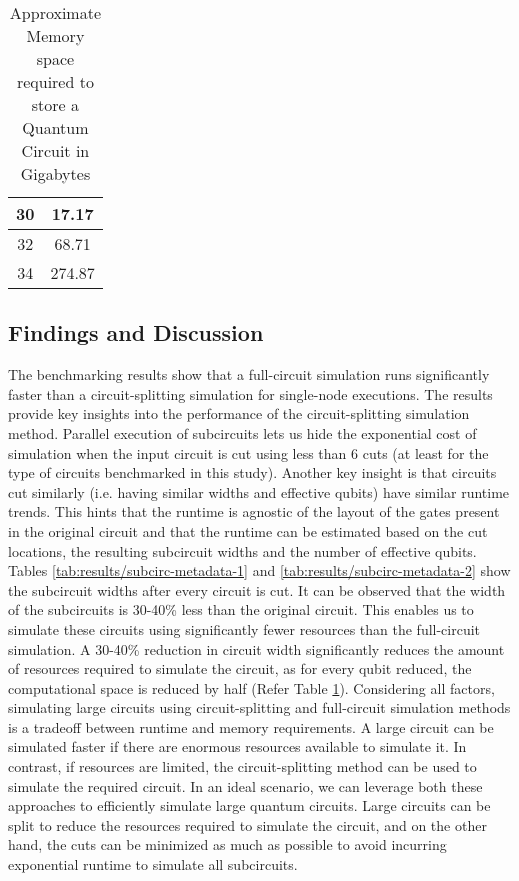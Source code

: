 \begin{table}[!htbp]
{\begin{tabular}{|c|c|}
30                     & 17.17                                                                                                       \\ \hline
32                     & 68.71                                                                                                       \\ \hline
34                     & 274.87                                                                                                      \\ \hline
\end{tabular}
}
\caption{Approximate Memory space required to store a Quantum Circuit in Gigabytes}
\label{tab:results/req_storage}
\end{table}



\subsection*{Findings and Discussion}

The benchmarking results show that a full-circuit simulation runs significantly faster than a circuit-splitting simulation for single-node executions. The results provide key insights into the performance of the circuit-splitting simulation method. Parallel execution of subcircuits lets us hide the exponential cost of simulation when the input circuit is cut using less than 6 cuts (at least for the type of circuits benchmarked in this study). Another key insight is that circuits cut similarly (i.e. having similar widths and effective qubits) have similar runtime trends. This hints that the runtime is agnostic of the layout of the gates present in the original circuit and that the runtime can be estimated based on the cut locations, the resulting subcircuit widths and the number of effective qubits. Tables \ref{tab:results/subcirc-metadata-1} and \ref{tab:results/subcirc-metadata-2} show the subcircuit widths after every circuit is cut. It can be observed that the width of the subcircuits is 30-40\% less than the original circuit. This enables us to simulate these circuits using significantly fewer resources than the full-circuit simulation. A 30-40\% reduction in circuit width significantly reduces the amount of resources required to simulate the circuit, as for every qubit reduced, the computational space is reduced by half (Refer Table \ref{tab:results/req_storage}). Considering all factors, simulating large circuits using circuit-splitting and full-circuit simulation methods is a tradeoff between runtime and memory requirements. A large circuit can be simulated faster if there are enormous resources available to simulate it. In contrast, if resources are limited, the circuit-splitting method can be used to simulate the required circuit. In an ideal scenario, we can leverage both these approaches to efficiently simulate large quantum circuits. Large circuits can be split to reduce the resources required to simulate the circuit, and on the other hand, the cuts can be minimized as much as possible to avoid incurring exponential runtime to simulate all subcircuits.